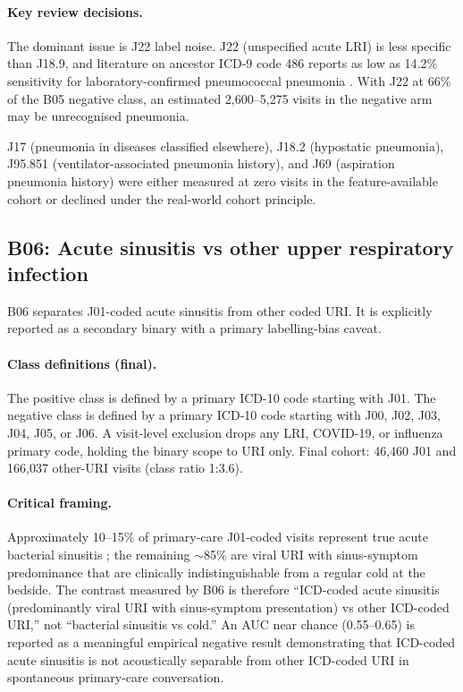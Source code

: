 \documentclass[utf8]{frontiers_suppmat} %
\begin{document}
\paragraph{Key review decisions.} The dominant issue is J22 label
noise. J22 (unspecified acute LRI) is less specific than J18.9, and
literature on ancestor ICD-9 code 486 reports as low as 14.2\%
sensitivity for laboratory-confirmed pneumococcal pneumonia \citep{icd9-486-pneumococcal-sensitivity-14pct}. With
J22 at 66\% of the B05 negative class, an estimated 2{,}600--5{,}275
visits in the negative arm may be unrecognised pneumonia.

J17 (pneumonia in diseases classified elsewhere), J18.2 (hypostatic
pneumonia), J95.851 (ventilator-associated pneumonia history), and
J69 (aspiration pneumonia history) were either measured at zero
visits in the feature-available cohort or declined under the real-world
cohort principle.

\subsection{B06: Acute sinusitis vs other upper respiratory infection}
\label{sec:supp-b06}

B06 separates J01-coded acute sinusitis from other coded URI. It is
explicitly reported as a secondary binary with a primary labelling-bias
caveat.

\paragraph{Class definitions (final).} The positive class is defined
by a primary ICD-10 code starting with J01. The negative class is
defined by a primary ICD-10 code starting with J00, J02, J03, J04,
J05, or J06. A visit-level exclusion drops any LRI, COVID-19, or
influenza primary code, holding the binary scope to URI only. Final
cohort: 46{,}460 J01 and 166{,}037 other-URI visits (class ratio 1:3.6).

\paragraph{Critical framing.} Approximately 10--15\% of primary-care
J01-coded visits represent true acute bacterial sinusitis \citep{j01-bacterial-sinusitis-fraction}; the
remaining $\sim$85\% are viral URI with sinus-symptom predominance
that are clinically indistinguishable from a regular cold at the
bedside. The contrast measured by B06 is therefore ``ICD-coded acute
sinusitis (predominantly viral URI with sinus-symptom presentation)
vs other ICD-coded URI,'' not ``bacterial sinusitis vs cold.'' An
AUC near chance (0.55--0.65) is reported as a meaningful empirical
negative result demonstrating that ICD-coded acute sinusitis is not
acoustically separable from other ICD-coded URI in spontaneous
primary-care conversation.
\end{document}
